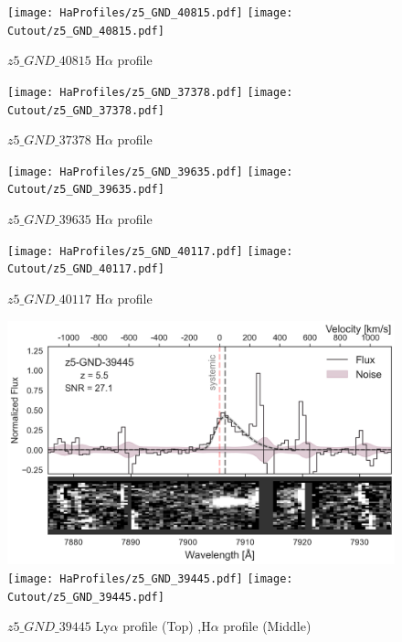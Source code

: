 \documentclass[12pt,english]{article}
\begin{document}
\clearpage
\begin{figure}
\begin{center}\texttt{[image: HaProfiles/z5\_GND\_40815.pdf]}
\texttt{[image: Cutout/z5\_GND\_40815.pdf]}
\caption{$z5\_GND\_40815$ H$\alpha$ profile}
\end{center}
\end{figure}
\clearpage
\begin{figure}
\begin{center}\texttt{[image: HaProfiles/z5\_GND\_37378.pdf]}
\texttt{[image: Cutout/z5\_GND\_37378.pdf]}
\caption{$z5\_GND\_37378$ H$\alpha$ profile}
\end{center}
\end{figure}
\clearpage
\begin{figure}
\begin{center}\texttt{[image: HaProfiles/z5\_GND\_39635.pdf]}
\texttt{[image: Cutout/z5\_GND\_39635.pdf]}
\caption{$z5\_GND\_39635$ H$\alpha$ profile}
\end{center}
\end{figure}
\clearpage
\begin{figure}
\begin{center}\texttt{[image: HaProfiles/z5\_GND\_40117.pdf]}
\texttt{[image: Cutout/z5\_GND\_40117.pdf]}
\caption{$z5\_GND\_40117$ H$\alpha$ profile}
\end{center}
\end{figure}
\clearpage
\begin{figure}
\begin{center}\includegraphics[width=12cm, trim=0.1cm 0cm 0cm -1cm]{LyaProfiles/z5_GND_39445.png}
\texttt{[image: HaProfiles/z5\_GND\_39445.pdf]}
\texttt{[image: Cutout/z5\_GND\_39445.pdf]}
\caption{$z5\_GND\_39445$ Ly$\alpha$ profile (Top) ,H$\alpha$ profile (Middle)}
\end{center}
\end{figure}
\end{document}
